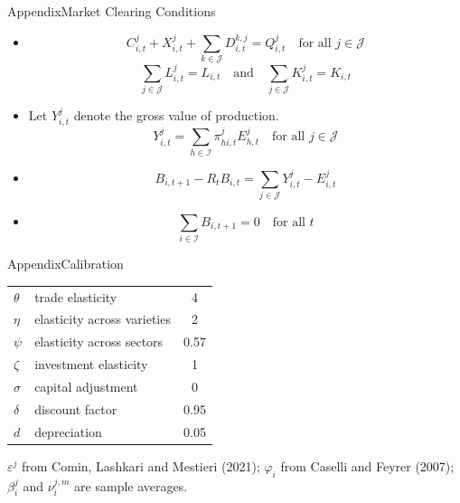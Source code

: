 \documentclass[10pt]{beamer}
\newcommand{\itms}{\itemsep5pt}
\newcommand{\apback}[1]{%
  \vfill\raggedleft\hyperlink{#1}{\structure{\tiny$\blacktriangleleft$\,back}}}
\begin{document}
\begin{frame}{Appendix}{Market Clearing Conditions}\label{ap:mc}
  \begin{itemize}\itms
    \item {}
      \begin{equation*}
        C^j_{i,t} + X^j_{i,t} + \sum_{k \in \mathcal{J}} D^{k,j}_{i,t} = Q^j_{i,t}
        \quad \text{for all } j \in \mathcal{J}
      \end{equation*}
      \begin{equation*}
        \sum_{j \in \mathcal{J}} L^j_{i,t} = L_{i,t} \quad \text{and} \quad
        \sum_{j \in \mathcal{J}} K^j_{i,t} = K_{i,t}
      \end{equation*}
    \item {} Let $Y^j_{i,t}$ denote the gross value of
      production.
      \begin{equation*}
        Y^j_{i,t} = \sum_{h \in \mathcal{I}} \pi^j_{hi,t} E^j_{h,t}
        \quad \text{for all } j \in \mathcal{J}
      \end{equation*}
    \item {}
      \begin{equation*}
        B_{i,t+1} - R_t B_{i,t} = \sum_{j \in \mathcal{J}} Y^j_{i,t} - E^j_{i,t}
      \end{equation*}
    \item {}
      \begin{equation*}
        \sum_{i \in \mathcal{I}} B_{i,t+1} = 0 \quad \text{for all } t
      \end{equation*}
  \end{itemize}
  \apback{fr:meth}
\end{frame}
\begin{frame}{Appendix}{Calibration}\label{ap:cal}
  \begin{center}
  \begin{tabular}{@{}llc@{}}
    \toprule
    $\theta$   & trade elasticity              & 4 \\
    $\eta$     & elasticity across varieties   & 2 \\
    $\psi$     & elasticity across sectors     & 0.57 \\
    $\zeta$    & investment elasticity         & 1 \\
    $\sigma$   & capital adjustment            & 0 \\
    $\delta$   & discount factor               & 0.95 \\
    $d$        & depreciation                  & 0.05 \\
    \bottomrule
  \end{tabular}
  \end{center}
  \vspace{8pt}
  $\varepsilon^j$ from Comin, Lashkari and Mestieri (2021); $\varphi_i$ from
  Caselli and Feyrer (2007); $\beta^j_i$ and $\nu^{j,m}_i$ are sample averages.
  \apback{fr:hh}
\end{frame}
\end{document}
